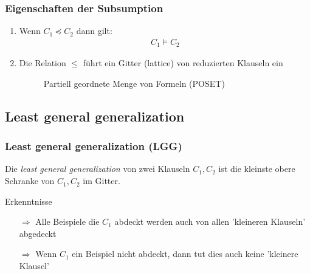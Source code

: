\begin{frame}
	\frametitle{Eigenschaften der Subsumption}
	\begin{enumerate}
		\item {
			Wenn $C_1 \preceq C_2$ dann gilt:
			\begin{align*}
				C_1 \vDash C_2
			\end{align*}
		}
		\item{ Die Relation $\leq$ führt ein Gitter (lattice) von reduzierten Klauseln ein
			\begin{figure}[H]
				\begin{center}
				\end{center}
				\caption{Partiell geordnete Menge von Formeln (POSET)}
				\label{fig:poset_atomic}
			\end{figure}
		}
	\end{enumerate}
\end{frame}

\subsection{Least general generalization}
\begin{frame}
	\frametitle{Least general generalization (LGG)}
	 Die \textit{least general generalization} von zwei Klauseln $C_1, C_2$ ist
	 die kleinste obere Schranke von $C_1,C_2$ im Gitter.

	\begin{block}{Erkenntnisse}
			\begin{itemize}
				\item [$\Rightarrow$] Alle Beispiele die $C_1$ abdeckt werden auch von
				allen 'kleineren Klauseln' abgedeckt
				\item[$\Rightarrow$] Wenn $C_1$ ein Beispiel nicht abdeckt,
				dann tut dies auch keine 'kleinere Klausel'
			\end{itemize}
	 \end{block}
\end{frame}

